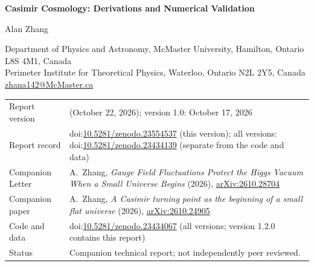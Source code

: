 \documentclass[11pt,a4paper]{article}
\numberwithin{equation}{section}%
\begin{document}
\begin{titlepage}
\begin{center}
{\LARGE\bfseries Casimir Cosmology: Derivations and Numerical Validation\par}
\vspace{1.2em}
{\large Alan Zhang\,\par}
\vspace{0.5em}
{\small Department of Physics and Astronomy, McMaster University, Hamilton, Ontario L8S 4M1, Canada\\
Perimeter Institute for Theoretical Physics, Waterloo, Ontario N2L 2Y5, Canada\\
\href{mailto:zhana142@McMaster.ca}{zhana142@McMaster.ca}\par}
\vspace{1.2em}
\begin{tabular}{@{}>{\raggedright\arraybackslash}p{}>{\raggedright\arraybackslash}p{}@{}}
Report version & 1.1 (October 22, 2026); version 1.0: October 17, 2026\\
Report record & doi:\href{https://doi.org/10.5281/zenodo.23554537}{10.5281/zenodo.23554537} (this version); all versions: doi:\href{https://doi.org/10.5281/zenodo.23434139}{10.5281/zenodo.23434139} (separate from the code and data)\\
Companion Letter & A.~Zhang, \emph{Gauge Field Fluctuations Protect the Higgs Vacuum When a Small Universe Begins} (2026), \href{https://arxiv.org/abs/2610.28704}{arXiv:2610.28704}\\
Companion paper & A.~Zhang, \emph{A Casimir turning point as the beginning of a small flat universe} (2026), \href{https://arxiv.org/abs/2610.24905}{arXiv:2610.24905}\\
Code and data & doi:\href{https://doi.org/10.5281/zenodo.23434067}{10.5281/zenodo.23434067} (all versions; version 1.2.0 contains this report)\\
Status & Companion technical report; not independently peer reviewed.
\end{tabular}
\end{center}
\vspace{1em}
\begin{abstract}
This report is the companion of a Letter and a paper on a flat three-torus universe whose contraction is turned around by the negative Casimir energy of the Standard Model, with antiperiodic fermions, at an edge of $722$ reduced Planck lengths.
Part~I derives the model step by step: the trace anomaly at a turning point, the Casimir energy and the zero modes of the Standard Model on the torus, the turning solution, and the Higgs zero mode, whose negative quartic coupling, $\lambda(\mub)\approx-0.0098$, is confined by the zero-point energy of the constant gauge modes down to a finite-volume threshold $\lambda_c\approx-0.012$.

\end{abstract}
\end{titlepage}
\end{document}
